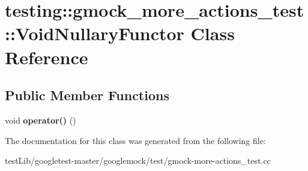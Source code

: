 \hypertarget{classtesting_1_1gmock__more__actions__test_1_1VoidNullaryFunctor}{}\section{testing\+:\+:gmock\+\_\+more\+\_\+actions\+\_\+test\+:\+:Void\+Nullary\+Functor Class Reference}
\label{classtesting_1_1gmock__more__actions__test_1_1VoidNullaryFunctor}
\subsection*{Public Member Functions}
\begin{DoxyCompactItemize}
\item 
\mbox{\label{classtesting_1_1gmock__more__actions__test_1_1VoidNullaryFunctor_a3b71273472780abc47927c57af209204}} 
void {\bfseries operator()} ()
\end{DoxyCompactItemize}


The documentation for this class was generated from the following file\+:\begin{DoxyCompactItemize}
\item 
test\+Lib/googletest-\/master/googlemock/test/gmock-\/more-\/actions\+\_\+test.\+cc\end{DoxyCompactItemize}
